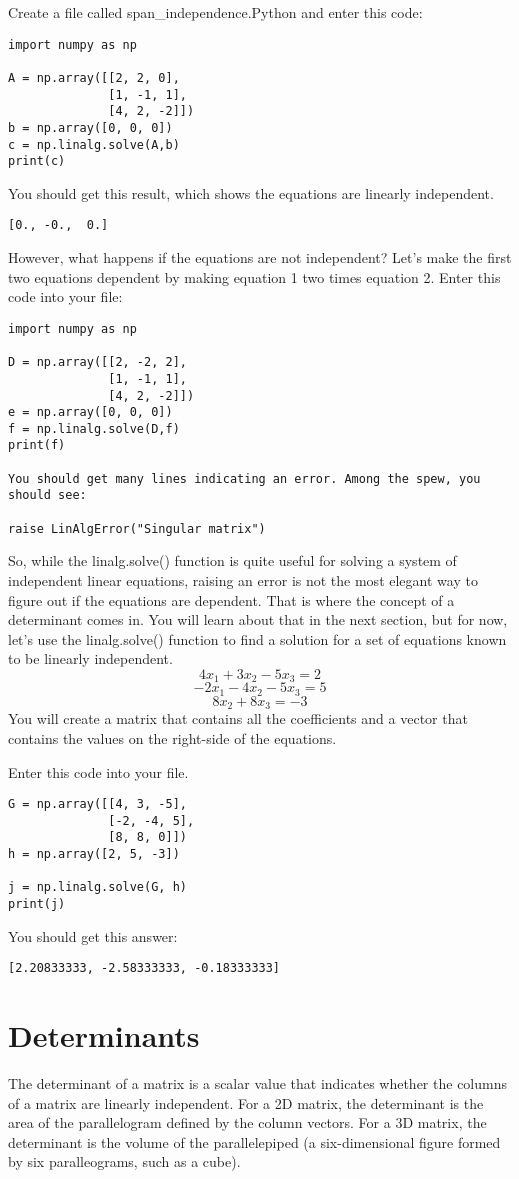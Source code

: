 Create a file called span\_independence.Python and enter this code:
\begin{Verbatim}
import numpy as np

A = np.array([[2, 2, 0], 
              [1, -1, 1],
              [4, 2, -2]])
b = np.array([0, 0, 0])
c = np.linalg.solve(A,b)
print(c)
\end{Verbatim}
You should get this result, which shows the equations are linearly independent.
\begin{Verbatim}
[0., -0.,  0.]
\end{Verbatim}
However, what happens if the equations are not independent? Let's make the first two equations dependent by making equation 1 two times equation 2. Enter this code into your file:
\begin{Verbatim}
import numpy as np

D = np.array([[2, -2, 2], 
              [1, -1, 1],
              [4, 2, -2]])
e = np.array([0, 0, 0])
f = np.linalg.solve(D,f)
print(f)

You should get many lines indicating an error. Among the spew, you should see:

raise LinAlgError("Singular matrix")
\end{Verbatim}
So, while the linalg.solve() function is quite useful for solving a system of independent linear equations, raising an error is not the most elegant way to figure out if the equations are dependent. That is where the concept of a determinant comes in. You will learn about that in the next section, but for now, let's use the  linalg.solve() function to find a solution for a set of equations known to be linearly independent.
$$4x_1 + 3x_2 - 5x_3 = 2$$
$$-2x_1- 4x_2 - 5x_3 = 5$$
$$       8x_2 + 8x_3  = -3$$
You will create a matrix that contains all the coefficients and a vector that contains the values on the right-side of the equations. 

Enter this code into your file. 
\begin{Verbatim}
G = np.array([[4, 3, -5], 
              [-2, -4, 5], 
              [8, 8, 0]])
h = np.array([2, 5, -3])

j = np.linalg.solve(G, h)
print(j)
\end{Verbatim}
You should get this answer:
\begin{Verbatim}
[2.20833333, -2.58333333, -0.18333333]
\end{Verbatim}

\section{Determinants}
The determinant of a matrix is a scalar value that indicates whether the columns of a matrix are linearly independent. For a 2D matrix, the determinant is the area of the parallelogram defined by the column vectors. For a 3D matrix, the determinant is the volume of the parallelepiped (a six-dimensional figure formed by six paralleograms, such as a cube). 

